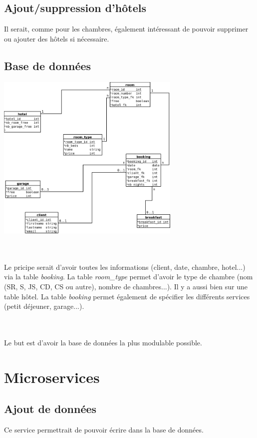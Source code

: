 \documentclass{article}
\begin{document}
\subsection{Ajout/suppression d'h\^{o}tels}
Il serait, comme pour les chambres, \'egalement int\'eressant de pouvoir supprimer ou ajouter des h\^{o}tels si n\'ecessaire.

\pagebreak
\subsection{Base de donn\'ees}
\vspace{1cm}
\hspace{3cm}
\includegraphics[height=8cm]{db.png}
\hfill \\ \\ \\
\begin{flushleft}
Le pricipe serait d'avoir toutes les informations (client, date, chambre, hotel...) via la table \textit{booking}. La table \textit{room\_type} permet d'avoir le type de chambre (nom (SR, S, JS, CD, CS ou autre), nombre de chambres...). Il y a aussi bien sur une table h\^{o}tel. La table \textit{booking} permet \'egalement de sp\'ecifier les diff\'erents services (petit d\'ejeuner, garage...).
\end{flushleft}
\hfill \\ \\
Le but est d'avoir la base de donn\'ees la plus modulable possible.
\pagebreak
\section{Microservices}
\subsection{Ajout de donn\'ees}
Ce service permettrait de pouvoir \'ecrire dans la base de donn\'ees.
\end{document}
